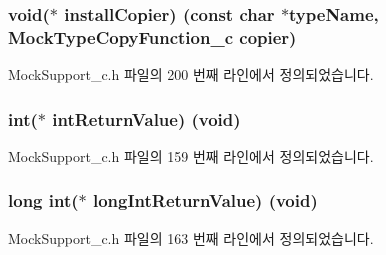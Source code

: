 \subsubsection[{\texorpdfstring{install\+Copier}{installCopier}}]{\setlength{\rightskip}{0pt plus 5cm}void($\ast$ install\+Copier) (const char $\ast$type\+Name, {\bf Mock\+Type\+Copy\+Function\+\_\+c} copier)}\hypertarget{struct_s_mock_support__c_a601d8bf3ba7c1b3cc26c22f08da0ae05}{}\label{struct_s_mock_support__c_a601d8bf3ba7c1b3cc26c22f08da0ae05}


Mock\+Support\+\_\+c.\+h 파일의 200 번째 라인에서 정의되었습니다.

\subsubsection[{\texorpdfstring{int\+Return\+Value}{intReturnValue}}]{\setlength{\rightskip}{0pt plus 5cm}int($\ast$ int\+Return\+Value) (void)}\hypertarget{struct_s_mock_support__c_aad818a82edd6c5f9caab3e4b0f57a772}{}\label{struct_s_mock_support__c_aad818a82edd6c5f9caab3e4b0f57a772}


Mock\+Support\+\_\+c.\+h 파일의 159 번째 라인에서 정의되었습니다.

\subsubsection[{\texorpdfstring{long\+Int\+Return\+Value}{longIntReturnValue}}]{\setlength{\rightskip}{0pt plus 5cm}long int($\ast$ long\+Int\+Return\+Value) (void)}\hypertarget{struct_s_mock_support__c_a1d43b8bf086a5ba30d408e2125d11839}{}\label{struct_s_mock_support__c_a1d43b8bf086a5ba30d408e2125d11839}


Mock\+Support\+\_\+c.\+h 파일의 163 번째 라인에서 정의되었습니다.

